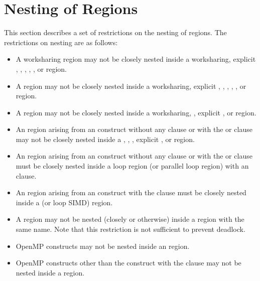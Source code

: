 \section{Nesting of Regions}
\label{sec:Nesting of Regions}
This section describes a set of restrictions on the nesting of regions. The restrictions on 
nesting are as follows:

\begin{itemize}
\item A worksharing region may not be closely nested inside a worksharing, explicit , ,
, , , or  region.

\item A  region may not be closely nested inside a worksharing, explicit , ,
, , , or  region.

\item A  region may not be closely nested inside a worksharing, ,  
explicit , or  region.

\item An  region arising from an  construct without
any clause or with the  or  clause may not be closely
nested inside a , , , explicit ,
or  region. 

\item An  region arising from an  construct without
any clause or with the  or  clause must be closely nested
inside a loop region (or parallel loop region) with an  clause.

\item An  region arising from an  construct with the
 clause must be closely nested inside a  (or loop SIMD)
region.

\item A  region may not be nested (closely or otherwise) inside a  
region with the same name. Note that this restriction is not sufficient to prevent 
deadlock.

\item OpenMP constructs may not be nested inside an  region.

\item OpenMP constructs other than the  construct with the
 clause may not be nested inside a  region.


\end{itemize}
